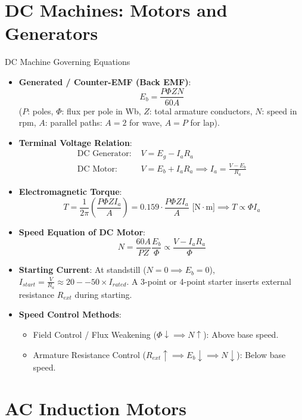 \section{DC Machines: Motors and Generators}

\begin{formulabox}{DC Machine Governing Equations}
\begin{itemize}[leftmargin=1.5em]
    \item \textbf{Generated / Counter-EMF (Back EMF)}:
    \[ E_b = \frac{P \Phi Z N}{60 A} \]
    ($P$: poles, $\Phi$: flux per pole in Wb, $Z$: total armature conductors, $N$: speed in rpm, $A$: parallel paths: $A = 2$ for wave, $A = P$ for lap).
    \item \textbf{Terminal Voltage Relation}:
    \begin{align*}
        \text{DC Generator: } & V = E_g - I_a R_a \\
        \text{DC Motor: } & V = E_b + I_a R_a \implies I_a = \frac{V - E_b}{R_a}
    \end{align*}
    \item \textbf{Electromagnetic Torque}:
    \[ T = \frac{1}{2\pi} \left(\frac{P \Phi Z I_a}{A}\right) = 0.159 \cdot \frac{P \Phi Z I_a}{A} \text{ [N}\cdot\text{m]} \implies T \propto \Phi I_a \]
    \item \textbf{Speed Equation of DC Motor}:
    \[ N = \frac{60 A}{P Z} \frac{E_b}{\Phi} \propto \frac{V - I_a R_a}{\Phi} \]
    \item \textbf{Starting Current}: At standstill ($N = 0 \implies E_b = 0$), $I_{start} = \frac{V}{R_a} \approx 20--50 \times I_{rated}$. A 3-point or 4-point starter inserts external resistance $R_{ext}$ during starting.
    \item \textbf{Speed Control Methods}:
    \begin{itemize}
        \item Field Control / Flux Weakening ($\Phi \downarrow \implies N \uparrow$): Above base speed.
        \item Armature Resistance Control ($R_{ext} \uparrow \implies E_b \downarrow \implies N \downarrow$): Below base speed.
    \end{itemize}
\end{itemize}
\end{formulabox}

\section{AC Induction Motors}

